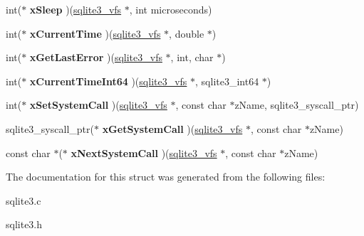 \begin{DoxyCompactItemize}
\item 
int($\ast$ {\bfseries x\+Sleep} )(\hyperlink{structsqlite3__vfs}{sqlite3\+\_\+vfs} $\ast$, int microseconds)\hypertarget{structsqlite3__vfs_a8ebcfaceced9713024cb8e2508fe6c1b}{}\label{structsqlite3__vfs_a8ebcfaceced9713024cb8e2508fe6c1b}

\item 
int($\ast$ {\bfseries x\+Current\+Time} )(\hyperlink{structsqlite3__vfs}{sqlite3\+\_\+vfs} $\ast$, double $\ast$)\hypertarget{structsqlite3__vfs_ab85a8a3ab59f76a6685508fefaa7b691}{}\label{structsqlite3__vfs_ab85a8a3ab59f76a6685508fefaa7b691}

\item 
int($\ast$ {\bfseries x\+Get\+Last\+Error} )(\hyperlink{structsqlite3__vfs}{sqlite3\+\_\+vfs} $\ast$, int, char $\ast$)\hypertarget{structsqlite3__vfs_a4994110c79d082f7770ce553d507748f}{}\label{structsqlite3__vfs_a4994110c79d082f7770ce553d507748f}

\item 
int($\ast$ {\bfseries x\+Current\+Time\+Int64} )(\hyperlink{structsqlite3__vfs}{sqlite3\+\_\+vfs} $\ast$, sqlite3\+\_\+int64 $\ast$)\hypertarget{structsqlite3__vfs_aa281584c422969b7f0df0e5f918fc590}{}\label{structsqlite3__vfs_aa281584c422969b7f0df0e5f918fc590}

\item 
int($\ast$ {\bfseries x\+Set\+System\+Call} )(\hyperlink{structsqlite3__vfs}{sqlite3\+\_\+vfs} $\ast$, const char $\ast$z\+Name, sqlite3\+\_\+syscall\+\_\+ptr)\hypertarget{structsqlite3__vfs_a69996d40229d6eabe6869bb3fc80b730}{}\label{structsqlite3__vfs_a69996d40229d6eabe6869bb3fc80b730}

\item 
sqlite3\+\_\+syscall\+\_\+ptr($\ast$ {\bfseries x\+Get\+System\+Call} )(\hyperlink{structsqlite3__vfs}{sqlite3\+\_\+vfs} $\ast$, const char $\ast$z\+Name)\hypertarget{structsqlite3__vfs_a604384e58c645e06b6db38d8a45e1103}{}\label{structsqlite3__vfs_a604384e58c645e06b6db38d8a45e1103}

\item 
const char $\ast$($\ast$ {\bfseries x\+Next\+System\+Call} )(\hyperlink{structsqlite3__vfs}{sqlite3\+\_\+vfs} $\ast$, const char $\ast$z\+Name)\hypertarget{structsqlite3__vfs_ac2930d34749977f39b1bbc27dc1de2b2}{}\label{structsqlite3__vfs_ac2930d34749977f39b1bbc27dc1de2b2}

\end{DoxyCompactItemize}


The documentation for this struct was generated from the following files\+:\begin{DoxyCompactItemize}
\item 
sqlite3.\+c\item 
sqlite3.\+h\end{DoxyCompactItemize}
